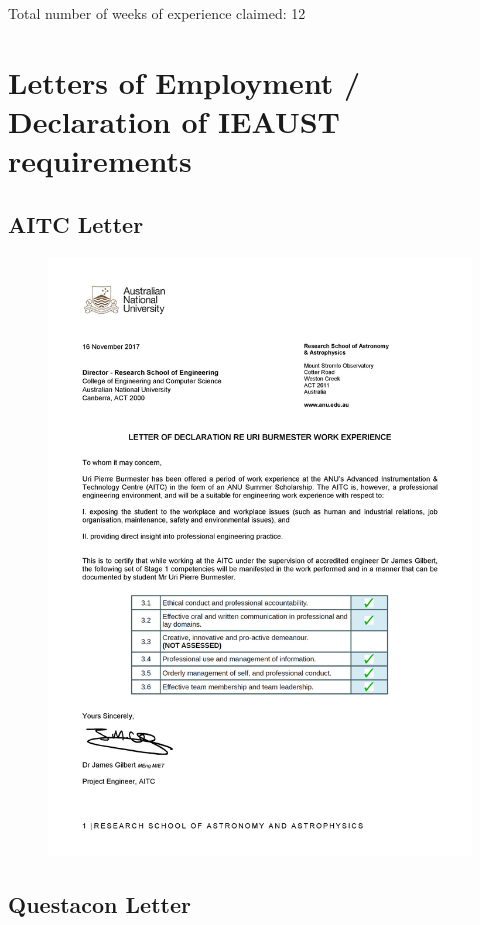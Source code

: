 \documentclass[11pt]{article}
\begin{document}
Total number of weeks of experience claimed: 12

\newpage

\section{Letters of Employment / Declaration of IEAUST requirements}
\subsection{AITC Letter}

\begin{figure}[!h] \centering
  \includegraphics[width=0.89\linewidth]{upb_offer-signed.jpg}
\end{figure}

\newpage

\subsection{Questacon Letter}
\end{document}
